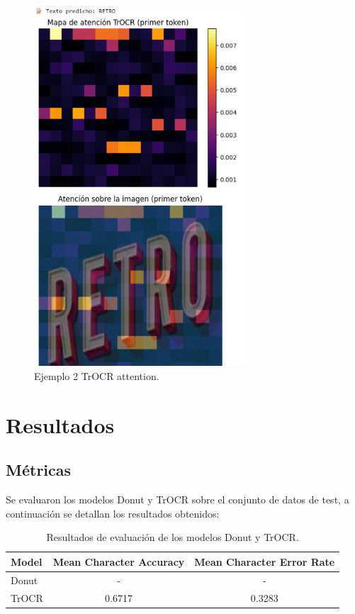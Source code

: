 \documentclass[12pt]{article}
\begin{document}
\begin{figure}[H]
    \centering
    \includegraphics[width=0.7\textwidth]{../reports/figures/attention_heatmap2.png} 
    \caption{Ejemplo 2 TrOCR attention.}
    \label{fig:attention2}
\end{figure}


\section{Resultados}

\subsection{Métricas}

Se evaluaron los modelos Donut y TrOCR sobre el conjunto de datos de test, a continuación se detallan los resultados
obtenidos:

\begin{table}[h!]
\centering
\begin{tabular}{|l|c|c|}
\hline
\textbf{Model} & \textbf{Mean Character Accuracy} & \textbf{Mean Character Error Rate} \\
\hline
Donut & - & - \\
TrOCR & 0.6717 &  0.3283 \\
\hline
\end{tabular}
\caption{Resultados de evaluación de los modelos Donut y TrOCR.}
\label{tab:donut-results}
\end{table}
\end{document}
